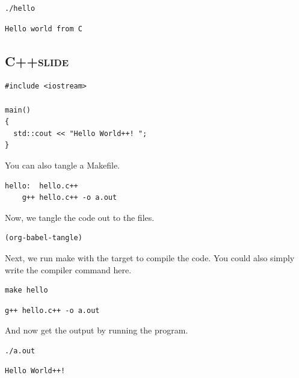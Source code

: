 \documentclass[11pt]{article}
\begin{document}
\begin{verbatim}
./hello
\end{verbatim}

\begin{verbatim}
Hello world from C
\end{verbatim}





\subsection{C++\hfill{}\textsc{slide}}
\label{sec-11-7}

\begin{verbatim}
#include <iostream>

main()
{
  std::cout << "Hello World++! ";
}
\end{verbatim}

You can also tangle a Makefile.

\begin{verbatim}
hello:	hello.c++
	g++ hello.c++ -o a.out
\end{verbatim}

Now, we tangle the code out to the files.
\begin{verbatim}
(org-babel-tangle)
\end{verbatim}



Next, we run make with the target to compile the code. You could also simply write the compiler command here.

\begin{verbatim}
make hello
\end{verbatim}

\begin{verbatim}
g++ hello.c++ -o a.out
\end{verbatim}


And now get the output by running the program.

\begin{verbatim}
./a.out
\end{verbatim}

\begin{verbatim}
Hello World++! 
\end{verbatim}
\end{document}
